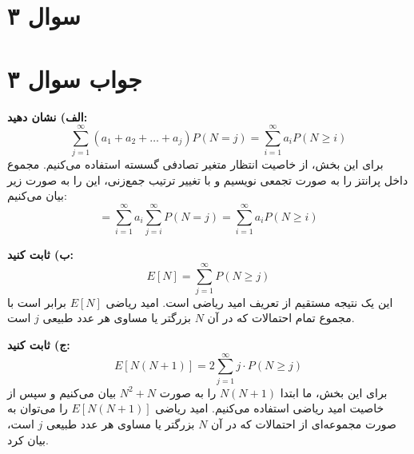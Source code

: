 \section*{سوال ۳}



\section*{جواب سوال ۳}

\textbf{الف) نشان دهید:} 
\[ \sum_{j=1}^{\infty} (a_1 + a_2 + \ldots + a_j) P(N = j) = \sum_{i=1}^{\infty} a_i P(N \geq i) \]
برای این بخش، از خاصیت انتظار متغیر تصادفی گسسته استفاده می‌کنیم. مجموع داخل پرانتز را به صورت تجمعی نویسیم و با تغییر ترتیب جمع‌زنی، این را به صورت زیر بیان می‌کنیم:
\[ = \sum_{i=1}^{\infty} a_i \sum_{j=i}^{\infty} P(N = j) = \sum_{i=1}^{\infty} a_i P(N \geq i) \]

\textbf{ب) ثابت کنید:} 
\[ E[N] = \sum_{j=1}^{\infty} P(N \geq j) \]
این یک نتیجه مستقیم از تعریف امید ریاضی است. امید ریاضی \( E[N] \) برابر است با مجموع تمام احتمالات که در آن \( N \) بزرگتر یا مساوی هر عدد طبیعی \( j \) است.

\textbf{ج) ثابت کنید:} 
\[ E[N(N + 1)] = 2 \sum_{j=1}^{\infty} j \cdot P(N \geq j) \]
برای این بخش، ما ابتدا \( N(N + 1) \) را به صورت \( N^2 + N \) بیان می‌کنیم و سپس از خاصیت امید ریاضی استفاده می‌کنیم. امید ریاضی \( E[N(N + 1)] \) را می‌توان به صورت مجموعه‌ای از احتمالات که در آن \( N \) بزرگتر یا مساوی هر عدد طبیعی \( j \) است، بیان کرد.
